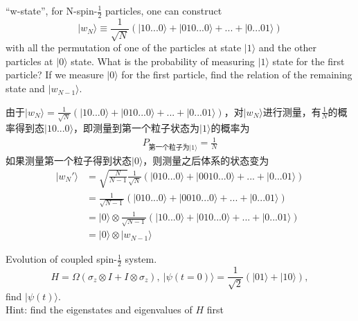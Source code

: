 \documentclass[UTF8,12pt]{article} %
\makeatletter
\newenvironment{proof}[1][\protect\proofname]{\par
\normalfont\topsep6\p@\@plus6\p@\relax
\trivlist
\itemindent\parindent
\item[\hskip\labelsep
\scshape
#1]\ignorespaces
}{%
\endtrivlist\@endpefalse
}
\renewcommand{\proofname}{\it{Solution}}
\makeatother
\begin{document}
\begin{exercise}{}{}
``w-state'', for N-spin-$\frac{1}{2}$ particles, one can construct
$$|w_{N}\rangle \equiv \frac{1}{\sqrt{N}}(|10...0\rangle + |010...0\rangle + ... + |0...01\rangle)$$
with all the permutation of one of the particles at state $|1\rangle$ and the other particles at $|0\rangle$ state. What is the probability of measuring $|1\rangle$ state for the first particle? If we measure $|0\rangle$ for the first particle, find the relation of the remaining state and $|w_{N-1}\rangle$.
\end{exercise}

\begin{proof}[解]
由于$|w_{N}\rangle = \frac{1}{\sqrt{N}}(|10...0\rangle + |010...0\rangle + ... + |0...01\rangle)$，对$|w_{N}\rangle$进行测量，有$\frac{1}{N}$的概率得到态$|10...0\rangle$，即测量到第一个粒子状态为$|1\rangle$的概率为
\begin{align}
P_{\text{第一个粒子为}|1\rangle} = \frac{1}{N}
\end{align}
如果测量第一个粒子得到状态$|0\rangle$，则测量之后体系的状态变为
\begin{align}
|w_{N}'\rangle &= \sqrt{\frac{N}{N-1}} \frac{1}{\sqrt{N}}(|010...0\rangle + |0010...0\rangle + ... + |0...01\rangle) \\
&= \frac{1}{\sqrt{N-1}}(|010...0\rangle + |0010...0\rangle + ... + |0...01\rangle) \\
&= |0\rangle \otimes \frac{1}{\sqrt{N-1}}(|10...0\rangle + |010...0\rangle + ... + |0...01\rangle) \\
&= |0\rangle \otimes |w_{N-1}\rangle
\end{align}
\end{proof}


\begin{exercise}{}{}
Evolution of coupled spin-$\frac{1}{2}$ system.
$$H = \Omega(\sigma_{z}\otimes I + I\otimes \sigma_{z}),~ |\psi(t=0)\rangle = \frac{1}{\sqrt{2}}(|01\rangle + |10\rangle),$$
find $|\psi(t)\rangle$.\\
Hint: find the eigenstates and eigenvalues of $H$ first
\end{exercise}
\end{document}
